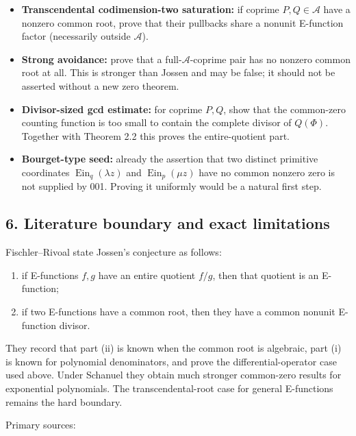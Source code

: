 \documentclass[11pt]{article}
\theoremstyle{keio}
\theoremstyle{definition}
\theoremstyle{remark}
\providecommand{\tightlist}{\setlength{\itemsep}{0pt}\setlength{\parskip}{0pt}}
\begin{document}
\begin{itemize}
\tightlist
\item
  \textbf{Transcendental codimension-two saturation:} if coprime
  \(P,Q\in\mathscr A\) have a nonzero common root, prove that their pullbacks
  share a nonunit E-function factor (necessarily outside \(\mathscr A\)).
\item
  \textbf{Strong avoidance:} prove that a full-\(\mathscr A\)-coprime pair has no
  nonzero common root at all. This is stronger than Jossen and may be false;
  it should not be asserted without a new zero theorem.
\item
  \textbf{Divisor-sized gcd estimate:} for coprime \(P,Q\), show that the common-zero
  counting function is too small to contain the complete divisor of
  \(Q(\Phi)\). Together with Theorem 2.2 this proves the entire-quotient part.
\item
  \textbf{Bourget-type seed:} already the assertion that two distinct primitive
  coordinates \(\operatorname{Ein}_q(\lambda z)\) and
  \(\operatorname{Ein}_p(\mu z)\) have no common nonzero zero is not supplied
  by 001. Proving it uniformly would be a natural first step.
\end{itemize}

\subsection{6. Literature boundary and exact limitations}

Fischler--Rivoal state Jossen's conjecture as follows:

\begin{enumerate}
\def\labelenumi{\arabic{enumi}.}
\tightlist
\item
  if E-functions \(f,g\) have an entire quotient \(f/g\), then that quotient
  is an E-function;
\item
  if two E-functions have a common root, then they have a common nonunit
  E-function divisor.
\end{enumerate}

They record that part (ii) is known when the common root is algebraic, part
(i) is known for polynomial denominators, and prove the differential-operator
case used above. Under Schanuel they obtain much stronger common-zero results
for exponential polynomials. The transcendental-root case for general
E-functions remains the hard boundary.

Primary sources:
\end{document}
